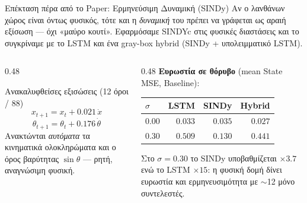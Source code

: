 \documentclass[10pt, aspectratio=169]{beamer}
\begin{document}
\begin{frame}{Επέκταση πέρα από το \textlatin{Paper}: Ερμηνεύσιμη Δυναμική (\textlatin{SINDy})}
    \footnotesize Αν ο λανθάνων χώρος είναι όντως φυσικός, τότε και η \emph{δυναμική} του πρέπει να γράφεται ως αραιή εξίσωση — όχι «μαύρο κουτί». Εφαρμόσαμε \textlatin{SINDYc} στις φυσικές διαστάσεις και το συγκρίναμε με το \textlatin{LSTM} και ένα \textlatin{gray-box hybrid} (\textlatin{SINDy} + υπολειμματικό \textlatin{LSTM}).\par\vspace{0.15cm}
    \begin{columns}[onlytextwidth, T]
        \begin{column}{0.48\textwidth}
            \begin{block}{Ανακαλυφθείσες εξισώσεις (12 όροι / 88)}
                \scriptsize
                \[ x_{t+1} = x_t + 0.021\,\dot{x} \]
                \[ \theta_{t+1} = \theta_t + 0.176\,\dot{\theta} \]
                \scriptsize Ανακτώνται \emph{αυτόματα} τα κινηματικά ολοκληρώματα και ο όρος βαρύτητας $\sin\theta$ — ρητή, αναγνώσιμη φυσική.
            \end{block}
        \end{column}
        \begin{column}{0.48\textwidth}
            \scriptsize \textbf{Ευρωστία σε θόρυβο} (\textlatin{mean State MSE}, \textlatin{Baseline}):
            \par\vspace{0.1cm}\centering
            \begin{tabular}{l r r r}
                \toprule
                $\sigma$ & \textlatin{LSTM} & \textlatin{SINDy} & \textlatin{Hybrid} \\
                \midrule
                $0.00$ & $0.033$ & $0.035$ & $\mathbf{0.027}$ \\
                $0.30$ & $0.509$ & $\mathbf{0.130}$ & $0.441$ \\
                \bottomrule
            \end{tabular}
            \par\vspace{0.15cm}
            \raggedright\scriptsize Στο $\sigma=0.30$ το \textlatin{SINDy} υποβαθμίζεται $\times 3.7$ ενώ το \textlatin{LSTM} $\times 15$: η φυσική δομή δίνει ευρωστία και ερμηνευσιμότητα με $\sim$12 μόνο συντελεστές.
        \end{column}
    \end{columns}
\end{frame}
\end{document}
